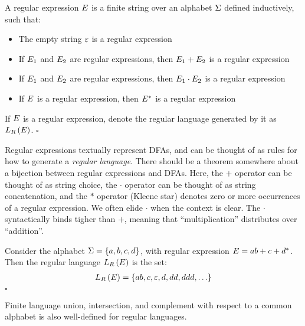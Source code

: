 \begin{definition}
  A regular expression \(E\)
  is a finite string over an alphabet \(\Sigma\)
  defined inductively, such that:
  \begin{itemize}
    \item
      The empty string \(\varepsilon\) is a regular expression

    \item
      If \(E_1\) and \(E_2\) are regular expressions,
      then \(E_1 + E_2\) is a regular expression

    \item
      If \(E_1\) and \(E_2\) are regular expressions,
      then \(E_1 \cdot E_2\) is a regular expression

    \item
      If \(E\) is a regular expression,
      then \(E^\ast\) is a regular expression
  \end{itemize}
  If \(E\) is a regular expression, denote the 
  regular language generated by it as \(L_{R}\left(E\right)\).
  \hfill\(\square\)
\end{definition}

Regular expressions textually represent DFAs, and can be thought of
as rules for how to generate a \textit{regular language}.
There should be a theorem somewhere about a bijection between
regular expressions and DFAs.
Here, the \(+\) operator can be thought of as string choice,
the \(\cdot\) operator can be thought of as string concatenation,
and the \(\ast\) operator (Kleene star) denotes zero or more occurrences
of a regular expression.
We often elide \(\cdot\) when the context is clear.
The \(\cdot\) syntactically
binds tigher than \(+\), meaning that ``multiplication''
distributes over ``addition''.

\begin{example}
  Consider the alphabet \(\Sigma = \left\{a, b, c, d\right\}\),
  with regular expression \(E = ab + c + d^\ast\).
  Then the regular language \(L_{R}\left(E\right)\) is the set:
  \begin{align*}
    L_{R}\left(E\right) =
      \left\{ab, c, \varepsilon, d, dd, ddd, \ldots\right\}
  \end{align*}
  \hfill\(\square\)
\end{example}

Finite language union, intersection, and complement
with respect to a common alphabet
is also well-defined for regular languages.

